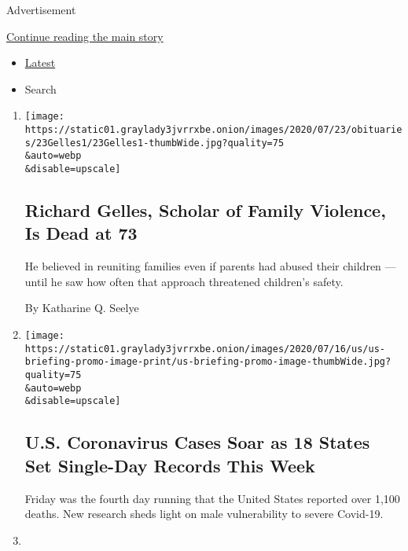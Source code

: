 Advertisement

\protect\hyperlink{after-mid2}{Continue reading the main story}

\begin{itemize}
\tightlist
\item
  \protect\hyperlink{stream-panel}{Latest}
\item
  Search
\end{itemize}

\begin{enumerate}
\def\labelenumi{\arabic{enumi}.}
\item
  \href{/2020/07/25/us/richard-gelles-dead.html}{}

  \texttt{[image: https://static01.graylady3jvrrxbe.onion/images/2020/07/23/obituaries/23Gelles1/23Gelles1-thumbWide.jpg?quality=75\\\&auto=webp\\\&disable=upscale]}

  \hypertarget{richard-gelles-scholar-of-family-violence-is-dead-at-73}{%
  \subsection{Richard Gelles, Scholar of Family Violence, Is Dead at
  73}\label{richard-gelles-scholar-of-family-violence-is-dead-at-73}}

  He believed in reuniting families even if parents had abused their
  children --- until he saw how often that approach threatened
  children's safety.

  By Katharine Q. Seelye
\item
  \href{/2020/07/25/world/coronavirus-covid-19.html}{}

  \texttt{[image: https://static01.graylady3jvrrxbe.onion/images/2020/07/16/us/us-briefing-promo-image-print/us-briefing-promo-image-thumbWide.jpg?quality=75\\\&auto=webp\\\&disable=upscale]}

  \hypertarget{us-coronavirus-cases-soar-as-18-states-set-single-day-records-this-week}{%
  \subsection{U.S. Coronavirus Cases Soar as 18 States Set Single-Day
  Records This
  Week}\label{us-coronavirus-cases-soar-as-18-states-set-single-day-records-this-week}}

  Friday was the fourth day running that the United States reported over
  1,100 deaths. New research sheds light on male vulnerability to severe
  Covid-19.
\item
  \href{/2020/07/25/us/victoria-price-thyroid-cancer.html}{}


\end{enumerate}
